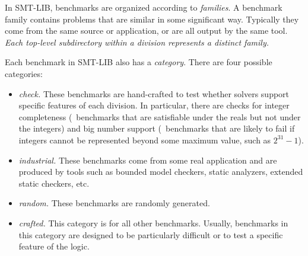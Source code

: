 \documentclass[12pt]{article}
\begin{document}
In SMT-LIB, benchmarks are organized according to \emph{families}.  A benchmark
family contains problems that are similar in some significant way.  Typically
they come from the same source or application, or are all output by the same
tool.  \emph{Each top-level subdirectory within a division represents a distinct
family.}  
%

Each benchmark in SMT-LIB also has a \emph{category}.  There are four possible
categories:
%
\begin{itemize}
\item \emph{check.} These benchmarks are hand-crafted to test whether
  solvers support specific features of each division.  In particular,
  there are checks for integer completeness (\ie\ benchmarks that are
  satisfiable under the reals but not under the integers) and big
  number support (\ie\ benchmarks that are likely to fail if integers
  cannot be represented beyond some maximum value, such as
  $2^{31}-1$).

  
\item \emph{industrial.} These benchmarks come from some real application
      and are produced by tools such as bounded model checkers, static analyzers, extended
      static checkers, etc.
\item \emph{random.} These benchmarks are randomly generated.
\item \emph{crafted.} This category is for all other benchmarks.  Usually,
  benchmarks in this category are designed to be particularly difficult or to
  test a specific feature of the logic.
\end{itemize}
\end{document}
